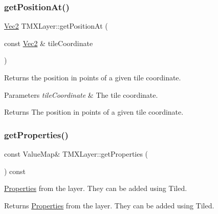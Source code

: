 \subsubsection{\texorpdfstring{get\+Position\+At()}{getPositionAt()}\hspace{0.1cm}{\footnotesize\ttfamily [2/2]}}
{\footnotesize\ttfamily \hyperlink{classVec2}{Vec2} T\+M\+X\+Layer\+::get\+Position\+At (\begin{DoxyParamCaption}\item[{const \hyperlink{classVec2}{Vec2} \&}]{tile\+Coordinate }\end{DoxyParamCaption})}

Returns the position in points of a given tile coordinate.


\begin{DoxyParams}{Parameters}
{\em tile\+Coordinate} & The tile coordinate. \\
\hline
\end{DoxyParams}
\begin{DoxyReturn}{Returns}
The position in points of a given tile coordinate. 
\end{DoxyReturn}
\mbox{\label{classTMXLayer_aec0bca7dba4d5e454cf7b688388c2f5f}} 
\subsubsection{\texorpdfstring{get\+Properties()}{getProperties()}\hspace{0.1cm}{\footnotesize\ttfamily [1/4]}}
{\footnotesize\ttfamily const Value\+Map\& T\+M\+X\+Layer\+::get\+Properties (\begin{DoxyParamCaption}{ }\end{DoxyParamCaption}) const\hspace{0.3cm}{\ttfamily [inline]}}

\hyperlink{classProperties}{Properties} from the layer. They can be added using Tiled.

\begin{DoxyReturn}{Returns}
\hyperlink{classProperties}{Properties} from the layer. They can be added using Tiled. 
\end{DoxyReturn}
\mbox{\label{classTMXLayer_aec0bca7dba4d5e454cf7b688388c2f5f}} 
